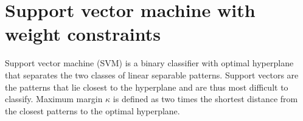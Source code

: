 \documentclass[11pt]{article}
\renewcommand{\[}{\begin{equation}}
\renewcommand{\]}{\end{equation}}
\begin{document}

\section*{Support vector machine with weight constraints}
Support vector machine (SVM) is a binary classifier with optimal hyperplane that separates the two classes of linear separable patterns. Support vectors are the patterns that lie closest to the hyperplane and are thus most difficult to classify. Maximum margin $\kappa$ is defined as two times the shortest distance from the closest patterns to the optimal hyperplane.
\end{document}
